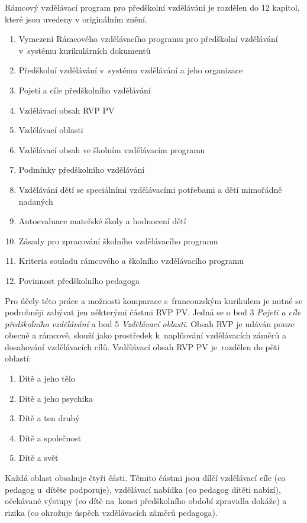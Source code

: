 		\break \noindent
		Rámcový vzdělávací program pro předškolní vzdělávání je rozdělen do 12 kapitol, které jsou uvedeny v originálním znění. \citep[s.~2]{RVP}
		\begin{enumerate}[1]
			\setlength\itemsep{-2mm}

			\item Vymezení Rámcového vzdělávacího programu pro předškolní vzdělávání v systému kurikulárních dokumentů
			\item Předškolní vzdělávání v systému vzdělávání a jeho organizace
			\item Pojetí a cíle předškolního vzdělávání
			\item Vzdělávací obsah RVP PV
			\item Vzdělávací oblasti
			\item Vzdělávací obsah ve školním vzdělávacím programu 
			\item Podmínky předškolního vzdělávání
			\item Vzdělávání dětí se speciálními vzdělávacími potřebami a dětí mimořádně nadaných
			\item Autoevaluace mateřské školy a hodnocení dětí
			\item Zásady pro zpracování školního vzdělávacího programu
			\item Kriteria souladu rámcového a školního vzdělávacího programu
			\item Povinnost předškolního pedagoga
		\end{enumerate}

		Pro účely této práce a možnosti komparace s francouzským kurikulem je nutné se podrobněji zabývat jen některými částmi RVP PV. Jedná se o bod 3 \emph{Pojetí a cíle předškolního vzdělávání} a bod 5 \emph{Vzdělávací oblasti}.
		Obsah RVP je udáván pouze obecně a rámcově, slouží jako prostředek k naplňování
		vzdělávacích záměrů a dosahování vzdělávacích cílů. Vzdělávací obsah RVP PV je rozdělen do pěti oblastí:

		\begin{enumerate}[1]
			\setlength\itemsep{-2mm}
			\item Dítě a jeho tělo
			\item Dítě a jeho psychika
			\item Dítě a ten druhý
			\item Dítě a společnost
			\item Dítě a svět
		\end{enumerate}

		Každá oblast obsahuje čtyři části. Těmito částmi jsou dílčí vzdělávací cíle (co pedagog u~dítěte podporuje), vzdělávací nabídka (co pedagog dítěti nabízí), očekávané výstupy (co dítě na konci předškolního období zpravidla dokáže) a rizika (co ohrožuje úspěch vzdělávacích záměrů pedagoga).

